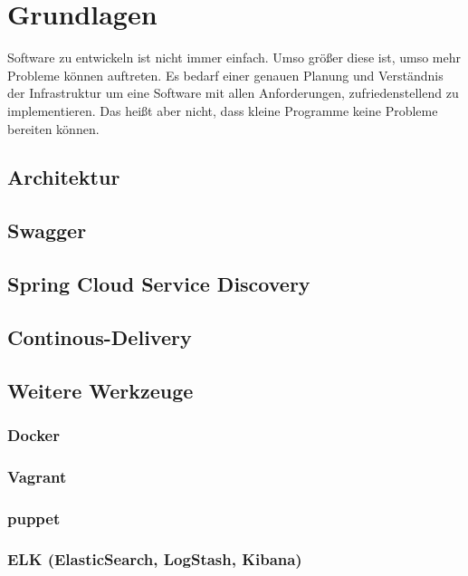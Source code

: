 \chapter{Grundlagen}
\label{chap:grundlagen}
Software zu entwickeln ist nicht immer einfach. Umso größer diese ist, umso mehr Probleme können auftreten. Es bedarf einer genauen Planung und Verständnis der Infrastruktur um eine Software mit allen Anforderungen, zufriedenstellend zu implementieren. Das heißt aber nicht, dass kleine Programme keine Probleme bereiten können. 

\section{Architektur}

\section{Swagger}

\section{Spring Cloud Service Discovery}

\section{Continous-Delivery}

\section{Weitere Werkzeuge}

\subsection{Docker}

\subsection{Vagrant}

\subsection{puppet}

\subsection{ELK (ElasticSearch, LogStash, Kibana)}

